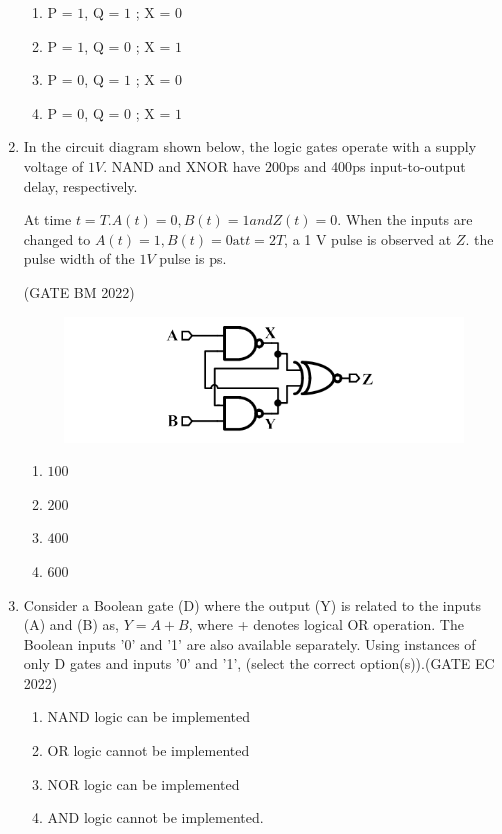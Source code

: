 \begin{enumerate}
		\begin{enumerate}[label=(\Alph*)]
		\item P = $1$, Q = $1$ ; X = $0$
		\item P = $1$, Q = $0$ ; X = $1$
		\item P = $0$, Q = $1$ ; X = $0$
		\item P = $0$, Q = $0$ ; X = $1$
	\end{enumerate}

\item In the circuit diagram shown below, the logic gates operate with a supply voltage of $1 V$. NAND and XNOR have $200$ps and $400$ps input-to-output delay, respectively.

At time $t=T.A(t)=0,B(t)=1 and Z(t)=0.$ When the inputs are changed to $A(t)=1,B(t)=0 \text{at} t=2T$, a 1 V pulse is observed at $Z$. the pulse width of the $1 V$ pulse is  ps.


\hfill{(GATE BM 2022)}

\begin{figure}[H]
\centering
\includegraphics[width=\columnwidth]{figs/bm2022.png}
\caption{}
\label{fig:GATE Digram}
\end{figure}

\begin{enumerate}
\item $100$
\item $200$
\item $400$
\item $600$
\end {enumerate}

\item 
Consider a Boolean gate (D) where the output (Y) is related to the inputs (A) and (B) as, $Y = A + B$, where + denotes logical OR operation. The Boolean inputs '0' and '1' are also available separately. Using instances of only D gates and inputs '0' and '1', (select the correct option(s)).\hfill{(GATE EC 2022)}

\begin{enumerate}
\item  NAND logic can be implemented
\item  OR logic cannot be implemented
\item  NOR logic can be implemented
\item  AND logic cannot be implemented.
\end{enumerate}


\end{enumerate}
